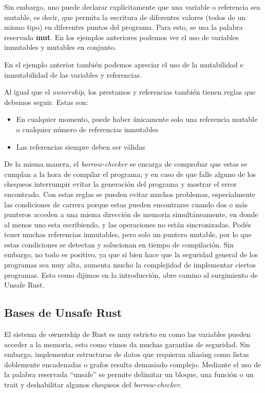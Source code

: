 Sin embargo, uno puede declarar explícitamente que una variable o referencia sea mutable, es decir, que permita la escritura de diferentes valores (todos de un mismo tipo) en diferentes puntos del programa. Para esto, se usa la palabra reservada \textbf{mut}. En los ejemplos anteriores podemos ver el uso de variables inmutables y mutables en conjunto.

En el ejemplo anterior también podemos apreciar el uso de la mutabilidad e inmutabilidad de las variables y referencias.

Al igual que el \textit{ownership}, los prestamos y referencias también tienen reglas que debemos seguir. Estas son:
\begin{itemize}
  \item En cualquier momento, puede haber únicamente solo una referencia mutable o cualquier número de referencias inmutables
  \item Las referencias siempre deben ser válidas
\end{itemize}

De la misma manera, el \textit{borrow-checker} se encarga de comprobar que estas se cumplan a la hora de compilar el programa; y en caso de que falle alguno de los chequeos interrumpir evitar la generación del programa y mostrar el error encontrado. Con estas reglas se pueden evitar muchos problemas, especialmente las condiciones de carrera porque estas pueden encontrarse cuando dos o más punteros acceden a una misma dirección de memoria simultáneamente, en donde al menos uno esta escribiendo, y las operaciones no están sincronizadas. Podés tener muchas referencias inmutables, pero solo un puntero mutable, por lo que estas condiciones se detectan y solucionan en tiempo de compilación.
Sin embargo, no todo es positivo, ya que si bien hace que la seguridad general de los programas sea muy alta, aumenta mucho la complejidad de implementar ciertos programas. Esto como dijimos en la introducción, abre camino al surgimiento de Unsafe Rust.

\subsection{Bases de Unsafe Rust}
 

El sistema de ownership de Rust es muy estricto en como las variables pueden acceder a la memoria, esto como vimos da muchas garantías de seguridad. Sin embargo, implementar estructuras de datos que requieran aliasing como listas doblemente encadenadas o grafos resulta demasiado complejo. Mediante el uso de la palabra reservada ``unsafe'' se permite delimitar un bloque, una función o un trait y deshabilitar algunos chequeos del \textit{borrow-checker}.

